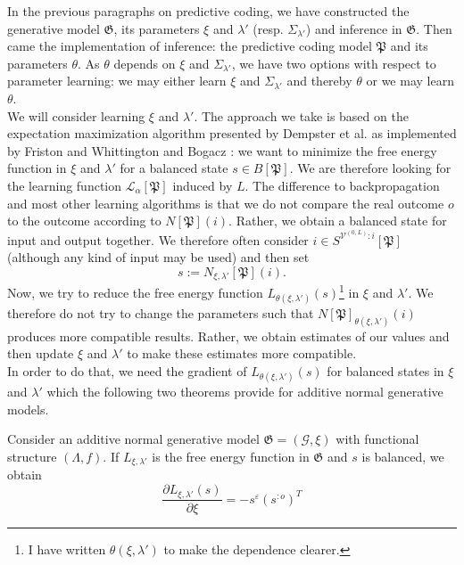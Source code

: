 \documentclass[a4paper,11pt]{report}
\begin{document}
\begin{Par}
In the previous paragraphs on predictive coding, we have constructed the generative model $\mathfrak{G}$, its parameters $\xi$ and $\lambda'$ (resp. $\Sigma_{\lambda'}$) and inference in $\mathfrak{G}$. Then came the implementation of inference: the predictive coding model $\mathfrak{P}$ and its parameters $\theta$. As $\theta$ depends on $\xi$ and $\Sigma_{\lambda'}$, we have two options with respect to parameter learning: we may either learn $\xi$ and $\Sigma_{\lambda'}$ and thereby $\theta$ or we may learn $\theta$.\\
We will consider learning $\xi$ and $\lambda'$. The approach we take is based on the expectation maximization algorithm presented by Dempster et al. \cite{Dempster1977} as implemented by Friston \cite{Friston2005} and Whittington and Bogacz \cite{Whittington2017}: we want to minimize the free energy function in $\xi$ and $\lambda'$ for a balanced state $s\in B[\mathfrak{P}]$. We are therefore looking for the learning function $\mathcal{L}_{\alpha}[\mathfrak{P}]$ induced by $L$. The difference to backpropagation and most other learning algorithms is that we do not compare the real outcome $o$ to the outcome according to $N[\mathfrak{P}](i)$. Rather, we obtain a balanced state for input and output together. We therefore often consider $i\in S^{\mathcal{V}^{(0,L)}:i}[\mathfrak{P}]$ (although any kind of input may be used) and then set
\[
s:=N_{\xi,\lambda'}[\mathfrak{P}](i).
\]
Now, we try to reduce the free energy function $L_{\theta(\xi,\lambda')}(s)$\footnote{
I have written $\theta(\xi,\lambda')$ to make the dependence clearer.} in $\xi$ and $\lambda'$. We therefore do not try to change the parameters such that $N[\mathfrak{P}]_{\theta(\xi,\lambda')}(i)$ produces more compatible results. Rather, we obtain estimates of our values and then update $\xi$ and $\lambda'$ to make these estimates more compatible.\\
In order to do that, we need the gradient of $L_{\theta(\xi,\lambda')}(s)$ for balanced states in $\xi$ and $\lambda'$ which the following two theorems provide for additive normal generative models.
\end{Par}

\begin{The}[Learning $\xi$]\label{learning-xi}
Consider an additive normal generative model $\mathfrak{G}=(\mathcal{G},\xi)$ with functional structure $(\Lambda,f)$. If $L_{\xi,\lambda'}$ is the free energy function in $\mathfrak{G}$ and $s$ is balanced, we obtain
\[
\frac{\partial L_{\xi,\lambda'}(s)}{\partial\xi}=-s^{\varepsilon}\left(s^{:o}\right)^T
\]
\end{The}
\end{document}
